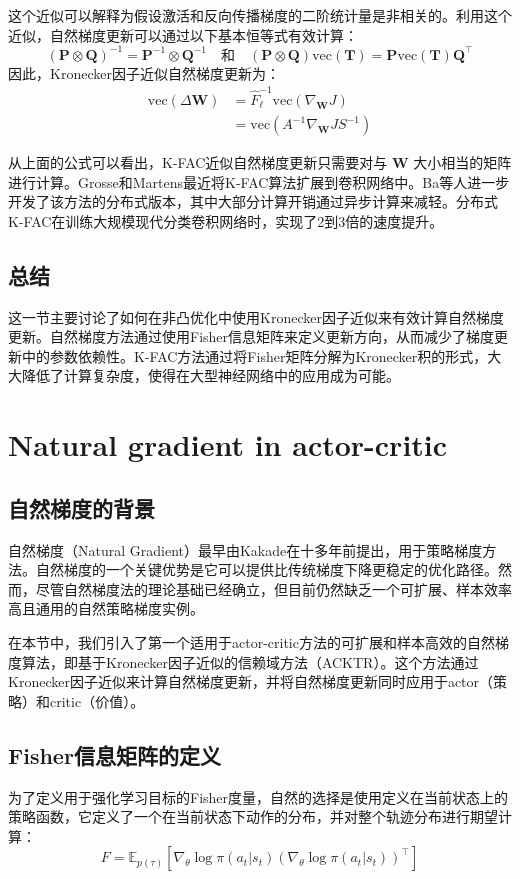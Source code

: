 \documentclass[twocolumn, 10pt]{article} %
\theoremstyle{remark}
\begin{document}
这个近似可以解释为假设激活和反向传播梯度的二阶统计量是非相关的。利用这个近似，自然梯度更新可以通过以下基本恒等式有效计算：
\[
(\mathbf{P} \otimes \mathbf{Q})^{-1} = \mathbf{P}^{-1} \otimes \mathbf{Q}^{-1} \quad \text{和} \quad (\mathbf{P} \otimes \mathbf{Q}) \text{vec}(\mathbf{T}) = \mathbf{P} \text{vec}(\mathbf{T}) \mathbf{Q}^\top
\]
因此，Kronecker因子近似自然梯度更新为：
\[
\begin{aligned}
    \text{vec}(\Delta \mathbf{W}) &= \hat{F}_\ell^{-1} \text{vec}(\nabla_{\mathbf{W}} J) \\
    &= \text{vec}\left(A^{-1} \nabla_{\mathbf{W}} J S^{-1}\right)
\end{aligned}
\]

从上面的公式可以看出，K-FAC近似自然梯度更新只需要对与 \(\mathbf{W}\) 大小相当的矩阵进行计算。Grosse和Martens最近将K-FAC算法扩展到卷积网络中。Ba等人进一步开发了该方法的分布式版本，其中大部分计算开销通过异步计算来减轻。分布式K-FAC在训练大规模现代分类卷积网络时，实现了2到3倍的速度提升。

\subsection{总结}
这一节主要讨论了如何在非凸优化中使用Kronecker因子近似来有效计算自然梯度更新。自然梯度方法通过使用Fisher信息矩阵来定义更新方向，从而减少了梯度更新中的参数依赖性。K-FAC方法通过将Fisher矩阵分解为Kronecker积的形式，大大降低了计算复杂度，使得在大型神经网络中的应用成为可能。



\section{Natural gradient in actor-critic}

\subsection{自然梯度的背景}
自然梯度（Natural Gradient）最早由Kakade在十多年前提出，用于策略梯度方法。自然梯度的一个关键优势是它可以提供比传统梯度下降更稳定的优化路径。然而，尽管自然梯度法的理论基础已经确立，但目前仍然缺乏一个可扩展、样本效率高且通用的自然策略梯度实例。

在本节中，我们引入了第一个适用于actor-critic方法的可扩展和样本高效的自然梯度算法，即基于Kronecker因子近似的信赖域方法（ACKTR）。这个方法通过Kronecker因子近似来计算自然梯度更新，并将自然梯度更新同时应用于actor（策略）和critic（价值）。

\subsection{Fisher信息矩阵的定义}
为了定义用于强化学习目标的Fisher度量，自然的选择是使用定义在当前状态上的策略函数，它定义了一个在当前状态下动作的分布，并对整个轨迹分布进行期望计算：
\[
F = \mathbb{E}_{p(\tau)}\left[\nabla_\theta \log \pi(a_t|s_t)(\nabla_\theta \log \pi(a_t|s_t))^\top\right]
\]
\end{document}
